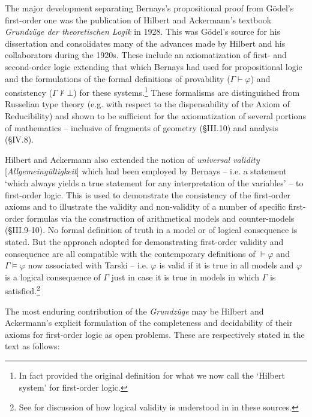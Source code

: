 \documentclass[11pt,fleqn,leqno]{article}
\def\phi{\varphi}
\def\proves{\vdash}
\begin{document}
The major development separating  Bernays's propositional proof  from G\"odel's first-order one was the publication of Hilbert and Ackermann's textbook \textsl{Grundz\"uge der theoretischen Logik} in 1928.  This was G\"odel's source for his dissertation \citeyearpar{Godel1929a} and consolidates many of the advances made by Hilbert and his collaborators during  the 1920s.  These include an axiomatization of first- and second-order logic extending that which Bernays had used for propositional logic and the formulations of the formal definitions of provability ($\Gamma \proves \phi$) and consistency ($\Gamma \not\proves \bot$) for these systems.\footnote{In fact \citet[\S I.10, \S III.5]{Hilbert1928} provided  the original definition for what we now call the `Hilbert system' for first-order logic.} These formalisms are distinguished from Russelian type theory (e.g. with respect to the dispensability of the Axiom of Reducibility) and shown to be sufficient for the axiomatization of several portions of mathematics -- inclusive of fragments of geometry (\S III.10) and analysis (\S IV.8).

Hilbert and Ackermann also extended the notion of \textsl{universal validity} [\textsl{Allgemeing\"ultigkeit}] which had been employed by Bernays -- i.e. a statement `which always yields a true statement for any interpretation of the variables'  -- to first-order logic.   This is used to demonstrate the consistency of the first-order axioms and to illustrate the validity and non-validity of a number of specific first-order formulas via the construction of arithmetical models and counter-models (\S III.9-10).    No formal definition of truth in a model or of logical consequence is stated.  But the approach adopted for demonstrating first-order validity and consequence are all compatible with the contemporary definitions of $\models \phi$ and $\Gamma \models \phi$ now associated with Tarski -- i.e. $\phi$ is valid if it is true in all models and $\phi$ is a logical consequence of $\Gamma$ just in case it is true in models in which $\Gamma$ is satisfied.\footnote{See \citep[pp. 44-45]{Hilbert2013} for discussion of how logical validity is understood in in these sources.}

The most enduring contribution of the \textsl{Grundz\"uge} may be Hilbert and Ackermann's explicit formulation of the completeness and decidability of their axioms for first-order logic as open problems.  These are respectively stated in the text as follows:
\end{document}
